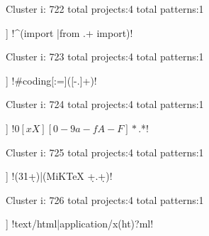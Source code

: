 Cluster i: 722
total projects:4
total patterns:1
\begin{multicols}{1}
\begin{description}[noitemsep,topsep=0pt]
\item [[4] ] \cverb!^\s*(import |from .+ import)!
\end{description}
\end{multicols}







Cluster i: 723
total projects:4
total patterns:1
\begin{multicols}{1}
\begin{description}[noitemsep,topsep=0pt]
\item [[4] ] \cverb!#\s*coding[:=]\s*([-\w.]+)!
\end{description}
\end{multicols}







Cluster i: 724
total projects:4
total patterns:1
\begin{multicols}{1}
\begin{description}[noitemsep,topsep=0pt]
\item [[4] ] \cverb!\s*\(0[xX][0-9a-fA-F]*\).*!
\end{description}
\end{multicols}







Cluster i: 725
total projects:4
total patterns:1
\begin{multicols}{1}
\begin{description}[noitemsep,topsep=0pt]
\item [[4] ] \cverb!(3\.1\d+)|(MiKTeX \d+.\d+)!
\end{description}
\end{multicols}







Cluster i: 726
total projects:4
total patterns:1
\begin{multicols}{1}
\begin{description}[noitemsep,topsep=0pt]
\item [[4] ] \cverb!text/html|application/x(ht)?ml!
\end{description}
\end{multicols}







